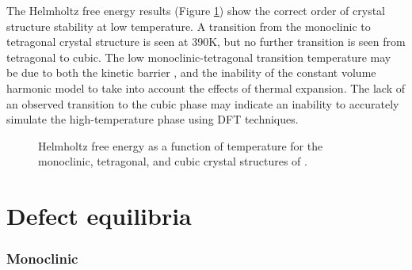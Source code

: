 
The Helmholtz free energy results (Figure \ref{Figure:helmholtz}) show the correct order of crystal structure stability at low temperature. A transition from the monoclinic to tetragonal crystal structure is seen at 390K, but no further transition is seen from tetragonal to cubic. The low monoclinic-tetragonal transition temperature may be due to both the kinetic barrier \cite{bansal1972martensitic,bansal1974martensitic}, and the inability of the constant volume harmonic model to take into account the effects of thermal expansion. The lack of an observed transition to the cubic phase may indicate an inability to accurately simulate the high-temperature phase using DFT techniques. 

\begin{figure}[ht] %
\begin{center}
		\caption{Helmholtz free energy as a function of temperature for the monoclinic, tetragonal, and cubic crystal structures of \zirconia .}
		\label{Figure:helmholtz}
	\end{center}
\end{figure}

\section{Defect equilibria} \label{brouwer_discussion_intrinsic}

\subsubsection*{Monoclinic}

